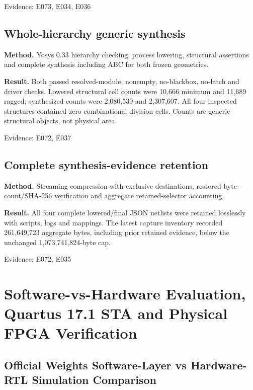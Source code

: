 \documentclass[11pt,a4paper]{article}
\begin{document}
{\small Evidence: E073,\allowbreak{} E034,\allowbreak{} E036}

\subsection{Whole-hierarchy generic synthesis}

\textbf{Method.} Yosys 0.33 hierarchy checking,\allowbreak{} process lowering,\allowbreak{} structural assertions and complete synthesis including ABC for both frozen geometries.

\textbf{Result.} Both passed resolved-module,\allowbreak{} nonempty,\allowbreak{} no-blackbox,\allowbreak{} no-latch and driver checks. Lowered structural cell counts were 10,\allowbreak{}666 minimum and 11,\allowbreak{}689 ragged; synthesized counts were 2,\allowbreak{}080,\allowbreak{}530 and 2,\allowbreak{}307,\allowbreak{}607. All four inspected structures contained zero combinational division cells. Counts are generic structural objects,\allowbreak{} not physical area.

{\small Evidence: E072,\allowbreak{} E037}

\subsection{Complete synthesis-evidence retention}

\textbf{Method.} Streaming compression with exclusive destinations,\allowbreak{} restored byte-count/\allowbreak{}SHA-256 verification and aggregate retained-selector accounting.

\textbf{Result.} All four complete lowered/\allowbreak{}final JSON netlists were retained losslessly with scripts,\allowbreak{} logs and mappings. The latest capture inventory recorded 261,\allowbreak{}649,\allowbreak{}723 aggregate bytes,\allowbreak{} including prior retained evidence,\allowbreak{} below the unchanged 1,\allowbreak{}073,\allowbreak{}741,\allowbreak{}824-byte cap.

{\small Evidence: E072,\allowbreak{} E035}

\section{Software-vs-Hardware Evaluation, Quartus 17.1 STA and Physical FPGA Verification}

\subsection{Official Weights Software-Layer vs Hardware-RTL Simulation Comparison}
\end{document}
